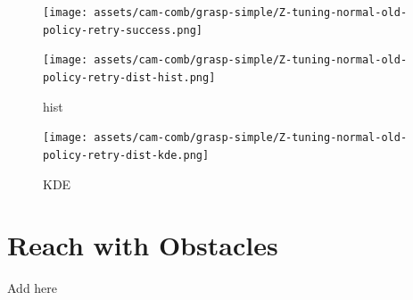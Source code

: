 \begin{figure}[!htb] %
  \centering
  \texttt{[image: assets/cam-comb/grasp-simple/Z-tuning-normal-old-policy-retry-success.png]}
  \caption{}\label{fig:Z-grasp-tuning-dist}
\end{figure}

\begin{figure}[!htb]
  \centering
  \texttt{[image: assets/cam-comb/grasp-simple/Z-tuning-normal-old-policy-retry-dist-hist.png]}
  \caption{hist}\label{subfig:}
\end{figure}

\begin{figure}[!htb]
  \centering
  \texttt{[image: assets/cam-comb/grasp-simple/Z-tuning-normal-old-policy-retry-dist-kde.png]}
  \caption{KDE}\label{subfig:}
\end{figure}



\section{Reach with Obstacles}
Add here